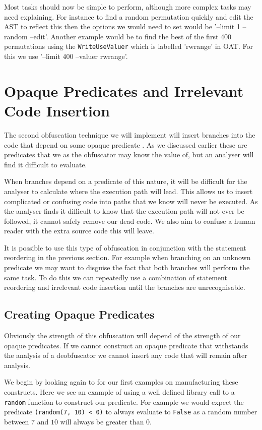 \documentclass[twoside,a4paper]{report}
\begin{document}
Most tasks should now be simple to perform, although more complex tasks may need explaining. For instance to find a random permutation quickly and edit the
AST to reflect this then the options we would need to set would be '--limit 1 --random --edit'. Another example would be to find the best of the first 400
permutations using the \texttt{WriteUseValuer} which is labelled 'rwrange' in OAT. For this we use '--limit 400 --valuer rwrange'.

\section{Opaque Predicates and Irrelevant Code Insertion}

The second obfuscation technique we will implement will insert branches into the code that depend on some opaque predicate \cite{taxobftrans}.
As we discussed earlier these are predicates that we as the obfuscator may know the value of, but an analyser will find it difficult to evaluate.

When branches depend on a predicate of this nature, it will be difficult for the analyser to calculate where the execution path will lead. This allows
us to insert complicated or confusing code into paths that we know will never be executed. As the analyser finds it difficult to know that the execution
path will not ever be followed, it cannot safely remove our dead code. We also aim to confuse a human reader with the extra source code this will leave.

It is possible to use this type of obfuscation in conjunction with the statement reordering in the previous section. For example when branching on
an unknown predicate we may want to disguise the fact that both branches will perform the same task. To do this we can repeatedly use a combination
of statement reordering and irrelevant code insertion until the branches are unrecognisable.

\subsection{Creating Opaque Predicates}

Obviously the strength of this obfuscation will depend of the strength of our opaque predicates. If we cannot construct an opaque predicate that withstands
the analysis of a deobfuscator we cannot insert any code that will remain after analysis.

We begin by looking again to \cite{taxobftrans} for our first examples on manufacturing these constructs. Here we see an example of using a well defined
library call to a \texttt{random} function to construct our predicate. For example we would expect the predicate \texttt{(random(7, 10) < 0)} to always
evaluate to \texttt{False} as a random number between $7$ and $10$ will always be greater than $0$.
\end{document}
